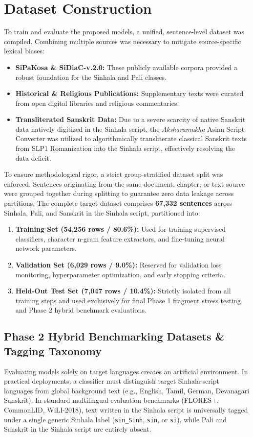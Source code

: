 \documentclass[conference]{IEEEtran}
\begin{document}
\section{Dataset Construction}
To train and evaluate the proposed models, a unified, sentence-level dataset was compiled. Combining multiple sources was necessary to mitigate source-specific lexical biases:
\begin{itemize}
    \item \textbf{SiPaKosa \& SiDiaC-v.2.0:} These publicly available corpora provided a robust foundation for the Sinhala and Pali classes.
    \item \textbf{Historical \& Religious Publications:} Supplementary texts were curated from open digital libraries and religious commentaries.
    \item \textbf{Transliterated Sanskrit Data:} Due to a severe scarcity of native Sanskrit data natively digitized in the Sinhala script, the \textit{Aksharamukha} Asian Script Converter \cite{b3} was utilized to algorithmically transliterate classical Sanskrit texts from SLP1 Romanization into the Sinhala script, effectively resolving the data deficit.
\end{itemize}
To ensure methodological rigor, a strict group-stratified dataset split was enforced. Sentences originating from the same document, chapter, or text source were grouped together during splitting to guarantee zero data leakage across partitions. The complete target dataset comprises \textbf{67,332 sentences} across Sinhala, Pali, and Sanskrit in the Sinhala script, partitioned into:
\begin{enumerate}
    \item \textbf{Training Set (54,256 rows / 80.6\%):} Used for training supervised classifiers, character n-gram feature extractors, and fine-tuning neural network parameters.
    \item \textbf{Validation Set (6,029 rows / 9.0\%):} Reserved for validation loss monitoring, hyperparameter optimization, and early stopping criteria.
    \item \textbf{Held-Out Test Set (7,047 rows / 10.4\%):} Strictly isolated from all training steps and used exclusively for final Phase 1 fragment stress testing and Phase 2 hybrid benchmark evaluations.
\end{enumerate}

\subsection{Phase 2 Hybrid Benchmarking Datasets \& Tagging Taxonomy}
Evaluating models solely on target languages creates an artificial environment. In practical deployments, a classifier must distinguish target Sinhala-script languages from global background text (e.g., English, Tamil, German, Devanagari Sanskrit). In standard multilingual evaluation benchmarks (FLORES+, CommonLID, WiLI-2018), text written in the Sinhala script is universally tagged under a single generic Sinhala label (\texttt{sin\_Sinh}, \texttt{sin}, or \texttt{si}), while Pali and Sanskrit in the Sinhala script are entirely absent.
\end{document}
